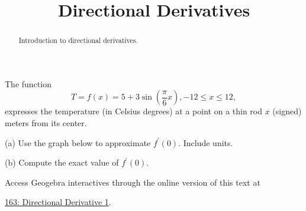 \documentclass{ximera}
\title{Directional Derivatives}
\begin{document}
\begin{abstract}
Introduction to directional derivatives.
\end{abstract}
\maketitle


\begin{question}  \label{Qdsdfsddsf6bd}

The function
\[
   T = f(x) = 5 + 3\sin \left(   \frac{\pi}{6}x  \right)   , -12\leq x \leq 12 ,
\]
expresses the temperature (in Celsius degrees) at a point on a thin rod $x$ (signed) meters from its center.

(a) Use the graph below to approximate $f^\prime(0)$. Include units.

(b) Compute the exact value of $f^\prime(0)$.

 
\begin{onlineOnly}
    \begin{center}
\end{center}
\end{onlineOnly}

Access Geogebra interactives through the online version of this text at
 
\href{https://www.geogebra.org/classic/cfkfwfpk}{163: Directional Derivative 1}.



\end{question}
\end{document}
